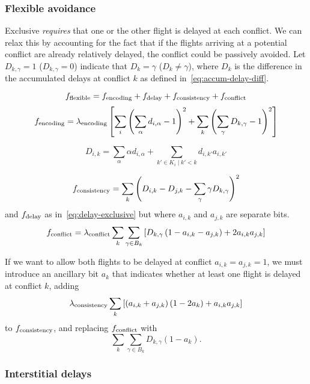 \subsubsection{Flexible avoidance}
Exclusive \emph{requires} that one or the other flight is delayed at each conflict.
We can relax this by accounting for the fact that if the flights arriving at a potential conflict are already relatively delayed, the conflict could be passively avoided.
Let $D_{k, \gamma} = 1$ ($D_{k, \gamma} = 0$) indicate that $D_k = \gamma$ ($D_k \neq \gamma$), where $D_k$ is the difference in the accumulated delays at conflict $k$ as defined in~\eqref{eq:accum-delay-diff}.

\begin{equation}
f_{\mathrm{flexible}}
=
f_{\mathrm{encoding}} +
f_{\mathrm{delay}} +
f_{\mathrm{consistency}} + 
f_{\mathrm{conflict}}
\end{equation}
\begin{equation}
f_{\mathrm{encoding}}
=
\lambda_{\mathrm{encoding}}
\left[
  \sum_i {\left(\sum_{\alpha} d_{i, \alpha} - 1\right)}^2
  +
  \sum_{k}
  {\left(\sum_{\gamma} D_{k, \gamma} - 1\right)}^2
\right]
\end{equation}

\begin{equation}
D_{i, k} = \sum_{\alpha} \alpha d_{i, \alpha} +
\sum_{\left. k' \in K_i \middle| k' < k\right.}
d_{i, k'} a_{i, k'}
\end{equation}

\begin{equation}
f_{\mathrm{consistency}}
=
\sum_k
{\left( 
D_{i, k} - D_{j, k}
-
\sum_{\gamma} \gamma D_{k, \gamma}
\right)}^2
\end{equation}
and $f_{\mathrm{delay}}$ as in~\eqref{eq:delay-exclusive} but where $a_{i,k}$ and $a_{j, k}$ are separate bits.
\begin{equation}
f_{\mathrm{conflict}}
=
\lambda_{\mathrm{conflict}}
\sum_k \sum_{\gamma \in B_k} 
\left[
D_{k, \gamma}
\left(1 - a_{i, k} - a_{j, k}\right)
+ 2 a_{i, k} a_{j, k}
\right]
\end{equation}

If we want to allow both flights to be delayed at conflict $a_{i,k} = a_{j, k} = 1$, we must introduce an ancillary bit $a_k$ that indicates whether at least one flight is delayed at conflict $k$, adding
\begin{equation}
  \lambda_{\mathrm{consistency}}
  \sum_{k} 
  \left[
    \left(a_{i, k} + a_{j, k} \right) \left(1 - 2 a_k\right)
    + a_{i, k} a_{j, k}
  \right]
\end{equation}
to $f_{\mathrm{consistency}}$, and
replacing $f_{\mathrm{conflict}}$ with
\begin{equation}
\sum_k \sum_{\gamma \in B_k} D_{k, \gamma} (1 - a_k).
\end{equation}

\subsubsection{Interstitial delays}


